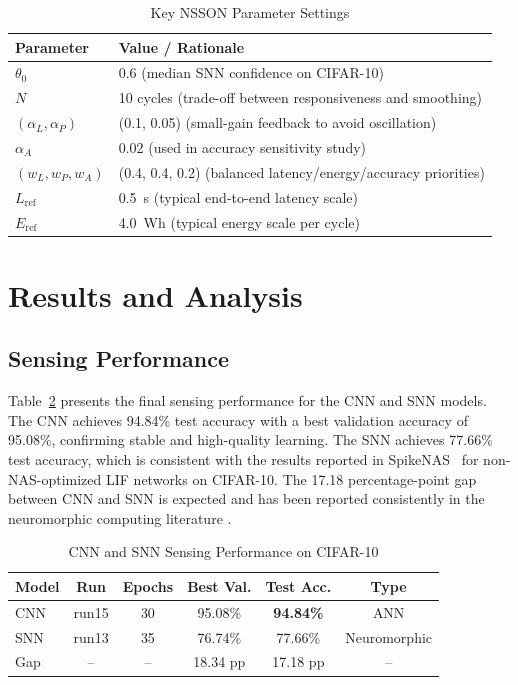 \documentclass[journal]{IEEEtran}
\newcommand{\revblue}[1]{\textcolor{revblue}{#1}}
\begin{document}
\begin{table}[!t]
\centering
\color{blue}
\renewcommand{\arraystretch}{1.25}
\caption{\revblue{Key NSSON Parameter Settings}}
\label{tab:param_settings}
\begin{tabular}{p{2.0cm}p{5.8cm}}
\toprule
\textbf{Parameter} & \textbf{Value / Rationale} \\
\midrule
$\theta_0$ & 0.6 (median SNN confidence on CIFAR-10) \\
$N$ & 10 cycles (trade-off between responsiveness and smoothing) \\
$(\alpha_L,\alpha_P)$ & (0.1, 0.05) (small-gain feedback to avoid oscillation) \\
$\alpha_A$ & 0.02 (used in accuracy sensitivity study) \\
$(w_L,w_P,w_A)$ & (0.4, 0.4, 0.2) (balanced latency/energy/accuracy priorities) \\
$L_{\text{ref}}$ & 0.5~s (typical end-to-end latency scale) \\
$E_{\text{ref}}$ & 4.0~Wh (typical energy scale per cycle) \\
\bottomrule
\end{tabular}
\end{table}

\section{Results and Analysis}
\label{sec:results}

\subsection{Sensing Performance}

Table~\ref{tab:sensing} presents the final sensing performance for the CNN
and SNN models. The CNN achieves 94.84\% test accuracy with a best
validation accuracy of 95.08\%, confirming stable and high-quality learning.
The SNN achieves 77.66\% test accuracy, which is consistent with the
results reported in SpikeNAS~\cite{putra2025spikenas} for non-NAS-optimized
LIF networks on CIFAR-10. The 17.18 percentage-point gap between CNN and
SNN is expected and has been reported consistently in the neuromorphic
computing literature \cite{putra2025spikenas,di2024ec,11201000,majumdar2025spiking}.

\begin{table}[!t]
\caption{CNN and SNN Sensing Performance on CIFAR-10}
\label{tab:sensing}
\centering
\renewcommand{\arraystretch}{1.2}
\begin{tabular}{lccccc}
\toprule
\textbf{Model} & \textbf{Run} & \textbf{Epochs} &
\textbf{Best Val.} & \textbf{Test Acc.} & \textbf{Type} \\
\midrule
CNN & run15 & 30 & 95.08\% & \textbf{94.84\%} & ANN \\
SNN & run13 & 35 & 76.74\% & 77.66\% & Neuromorphic \\
\midrule
Gap & -- & -- & 18.34 pp & 17.18 pp & -- \\
\bottomrule
\end{tabular}
\end{table}
\end{document}
